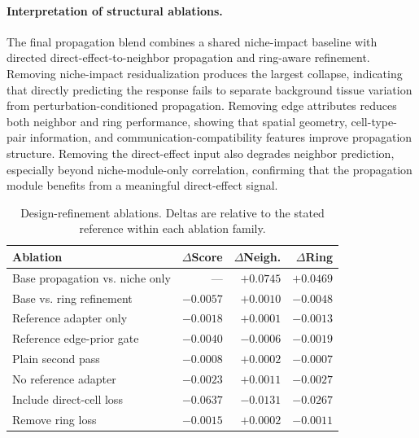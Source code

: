 \documentclass[sigconf,review,balance=false]{acmart}
\begin{document}
\paragraph{Interpretation of structural ablations.}
The final propagation blend combines a shared niche-impact baseline with directed direct-effect-to-neighbor propagation and ring-aware refinement. Removing niche-impact residualization produces the largest collapse, indicating that directly predicting the response fails to separate background tissue variation from perturbation-conditioned propagation. Removing edge attributes reduces both neighbor and ring performance, showing that spatial geometry, cell-type-pair information, and communication-compatibility features improve propagation structure. Removing the direct-effect input also degrades neighbor prediction, especially beyond niche-module-only correlation, confirming that the propagation module benefits from a meaningful direct-effect signal.




\begin{table}[t]
\centering
\caption{Design-refinement ablations. Deltas are relative to the stated reference within each ablation family.}
\label{tab:app_design_refinement_ablations}
\small
\setlength{\tabcolsep}{1.6pt}
\renewcommand{\arraystretch}{1.05}
\begin{tabularx}{\linewidth}{@{}>{\raggedright\arraybackslash}Xrrr@{}}
\toprule
Ablation & $\Delta$Score & $\Delta$Neigh. & $\Delta$Ring \\
\midrule
Base propagation vs. niche only & --- & $+0.0745$ & $+0.0469$ \\
Base vs. ring refinement        & $-0.0057$ & $+0.0010$ & $-0.0048$ \\
Reference adapter only          & $-0.0018$ & $+0.0001$ & $-0.0013$ \\
Reference edge-prior gate       & $-0.0040$ & $-0.0006$ & $-0.0019$ \\
Plain second pass               & $-0.0008$ & $+0.0002$ & $-0.0007$ \\
No reference adapter            & $-0.0023$ & $+0.0011$ & $-0.0027$ \\
Include direct-cell loss        & $-0.0637$ & $-0.0131$ & $-0.0267$ \\
Remove ring loss                & $-0.0015$ & $+0.0002$ & $-0.0011$ \\
\bottomrule
\end{tabularx}
\end{table}
\end{document}
